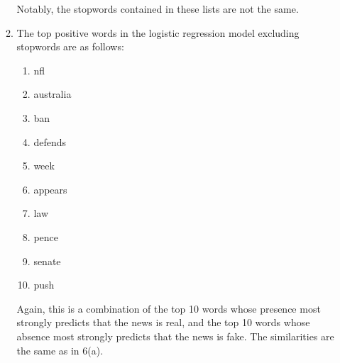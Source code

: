 \documentclass[10pt,letterpaper]{article}
\begin{document}
\begin{enumerate}
\begin{enumerate}
		Notably, the stopwords contained in these lists are not the same.

		\item %
		The top positive words in the logistic regression model excluding stopwords are as follows:
		\begin{enumerate}
			\item nfl
			\item australia
			\item ban
			\item defends
			\item week
			\item appears
			\item law
			\item pence
			\item senate
			\item push
		\end{enumerate}
		Again, this is a combination of the top 10 words whose presence most strongly predicts that the news is real, and the top 10 words whose absence most strongly predicts that the news is fake.
		The similarities are the same as in 6(a).


\end{enumerate}
\end{enumerate}
\end{document}
